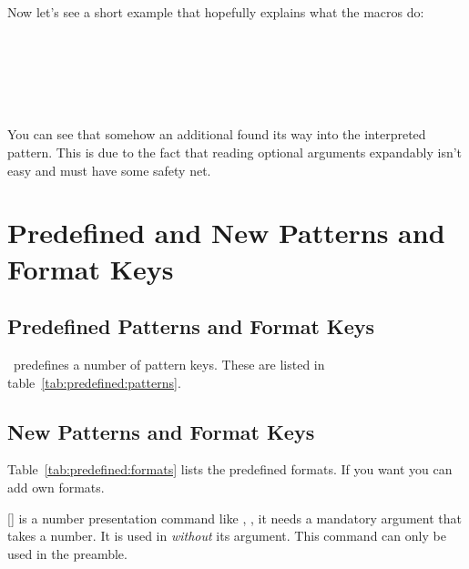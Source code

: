 \documentclass[load-preamble+]{cnltx-doc}
\begin{document}
Now let's see a short example that hopefully explains what the macros do:
\begin{example}
  \setcounter{testa}{11}
   \\
  \ttfamily\makeatletter
  \meaning\@cntfmts@parsed@pattern
  
  \bigskip
  \SaveCounterPattern\tmpa{}
  \meaning\tmpa \\
  \meaning\tmpb
  
  \bigskip
  \eSaveCounterPattern\tmpa{}
  \meaning\tmpa \\
  \meaning\tmpb
\end{example}
You can see that somehow an additional  found its way into the
interpreted pattern. This is due to the fact that reading optional arguments
expandably isn't easy and must have some safety net.

\section{Predefined and New Patterns and Format Keys}
\subsection{Predefined Patterns and Format Keys}
\cntformats\ predefines a number of pattern keys. These are listed in
table~\ref{tab:predefined:patterns}.

\subsection{New Patterns and Format Keys}
Table~\ref{tab:predefined:formats} lists the predefined formats.  If you want
you can add own formats.
\begin{commands}
  []
     is a number presentation command like , \ie,
    it needs a mandatory argument that takes a number.  It is used in
     \emph{without} its argument.  This command can only be used
    in the preamble.
\end{commands}
\end{document}
